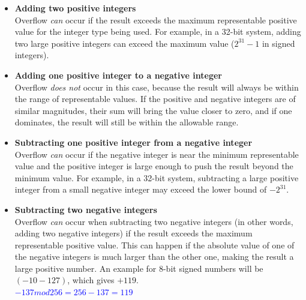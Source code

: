 \begin{itemize}
  \item[a)] \textbf{Adding two positive integers} \\
  Overflow \textit{can} occur if the result exceeds the maximum representable positive value for the integer type being used. For example, in a 32-bit system, adding two large positive integers can exceed the maximum value ($2^{31} - 1$ in signed integers).

  \item[b)] \textbf{Adding one positive integer to a negative integer} \\
  Overflow \textit{does not} occur in this case, because the result will always be within the range of representable values. If the positive and negative integers are of similar magnitudes, their sum will bring the value closer to zero, and if one dominates, the result will still be within the allowable range.

  \item[c)] \textbf{Subtracting one positive integer from a negative integer} \\
  Overflow \textit{can} occur if the negative integer is near the minimum representable value and the positive integer is large enough to push the result beyond the minimum value. For example, in a 32-bit system, subtracting a large positive integer from a small negative integer may exceed the lower bound of $-2^{31}$.

  \item[d)] \textbf{Subtracting two negative integers} \\
  Overflow \textit{can} occur when subtracting two negative integers (in other words, adding two negative integers) if the result exceeds the maximum representable positive value. This can happen if the absolute value of one of the negative integers is much larger than the other one, making the result a large positive number. An example for 8-bit signed numbers will be $(-10 - 127)$, which gives $+119$. \\
  \textcolor{blue}{
     \(-137  mod  256 = 256 - 137 = 119 \)
  }
\end{itemize}
\vspace{2em}